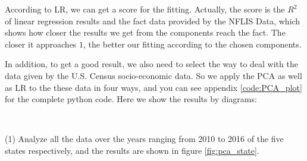 \documentclass{mcmthesis}
\begin{document}
According to LR, we can get a score for the fitting. Actually, the score is the $R^{2}$ of linear regression results and the fact data provided by the NFLIS Data, which shows how closer the results we get from the components reach the fact. The closer it approaches $1$, the better our fitting according to the chosen components.

In addition, to get a good result, we also need to select the way to deal with the data given by the U.S. Census socio-economic data. So we apply the PCA as well as LR to the these data in four ways, and you can see appendix \ref{code:PCA_plot} for the complete python code. Here we show the results by diagrams:

~\smallskip

(1) Analyze all the data over the years ranging from 2010 to 2016 of the five states respectively, and the results are shown in figure \ref{fig:pca_state}.
\end{document}
